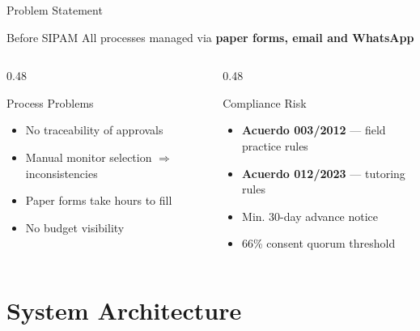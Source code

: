 \documentclass[aspectratio=169,12pt]{beamer}
\begin{document}
\begin{frame}{Problem Statement}
  \begin{alertblock}{Before SIPAM}
    All processes managed via \textbf{paper forms, email and WhatsApp}
  \end{alertblock}
  \vspace{0.3cm}
  \begin{columns}[T]
    \begin{column}{0.48\textwidth}
      \begin{block}{Process Problems}
        \begin{itemize}
          \item No traceability of approvals
          \item Manual monitor selection $\Rightarrow$ inconsistencies
          \item Paper forms take hours to fill
          \item No budget visibility
        \end{itemize}
      \end{block}
    \end{column}
    \begin{column}{0.48\textwidth}
      \begin{block}{Compliance Risk}
        \begin{itemize}
          \item \textbf{Acuerdo 003/2012} — field practice rules
          \item \textbf{Acuerdo 012/2023} — tutoring rules
          \item Min. 30-day advance notice
          \item 66\% consent quorum threshold
        \end{itemize}
      \end{block}
    \end{column}
  \end{columns}
\end{frame}

\section{System Architecture}
\end{document}
